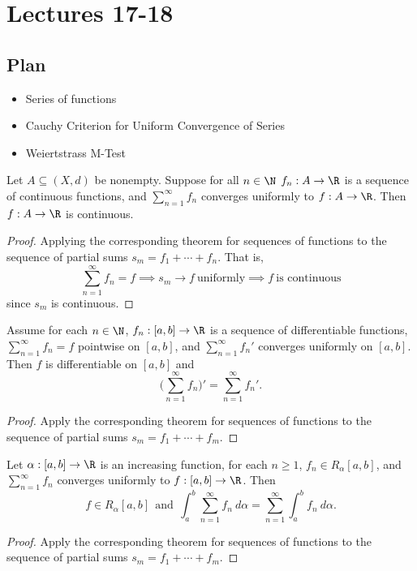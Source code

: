 \section{Lectures 17-18}

\subsection{Plan}

\begin{itemize}
    \item Series of functions
    \item Cauchy Criterion for Uniform Convergence of Series
    \item Weiertstrass M-Test
\end{itemize}

\begin{theorem}
Let \( A \subseteq  (X,d)  \) be nonempty. Suppose for all \( n \in \N \) \( {f}_{n} : A \to \R  \) is a sequence of continuous functions, and \( \sum_{ n=1  }^{ \infty  } {f}_{n} \) converges uniformly to \( f: A \to \R  \). Then \( f: A \to \R  \) is continuous.    
\end{theorem}
\begin{proof}
Applying the corresponding theorem for sequences of functions to the sequence of partial sums \( {s}_{m} = {f}_{1} + \cdots + {f}_{n} \). That is, 
\[  \sum_{ n=1  }^{ \infty  } {f}_{n} = f \implies {s}_{m} \to f \ \text{uniformly} \implies f \ \text{is continuous} \]
since \( {s}_{m}  \) is continuous.
\end{proof}

\begin{theorem}
    Assume for each \( n \in \N  \), \( {f}_{n} : [a,b] \to \R  \) is a sequence of differentiable functions, \( \sum_{ n=1  }^{ \infty  } {f}_{n} = f  \) pointwise on \( [a,b] \), and \( \sum_{ n=1  }^{ \infty  } {f}_{n}'  \) converges uniformly on \( [a,b] \). Then
    \( f  \) is differentiable on \( [a,b] \) and 
    \[  \Big(  \sum_{ n=1  }^{ \infty  } {f}_{n} \Big)' = \sum_{ n=1  }^{ \infty  } {f}_{n}'. \]
\end{theorem}
\begin{proof}
Apply the corresponding theorem for sequences of functions to the sequence of partial sums \( {s}_{m} = {f}_{1} + \cdots + {f}_{m} \).
\end{proof}

\begin{theorem}
    Let \( \alpha: [a,b] \to \R  \) is an increasing function, for each \( n \geq 1  \), \( {f}_{n} \in {R}_{\alpha}[a,b] \), and \( \sum_{ n=1  }^{ \infty  } {f}_{n} \) converges uniformly to \( f: [a,b] \to \R   \). Then 
    \[  f \in {R}_{\alpha}[a,b] \ \ \text{and} \ \ \int_{ a }^{ b }  \sum_{ n=1  }^{ \infty  } {f}_{n} \ d \alpha = \sum_{ n=1  }^{ \infty  } \int_{ a }^{ b }  {f}_{n} \ d \alpha. \]
\end{theorem}
\begin{proof}
Apply the corresponding theorem for sequences of functions to the sequence of partial sums \( {s}_{m} = {f}_{1} + \cdots + {f}_{m} \).
\end{proof}

